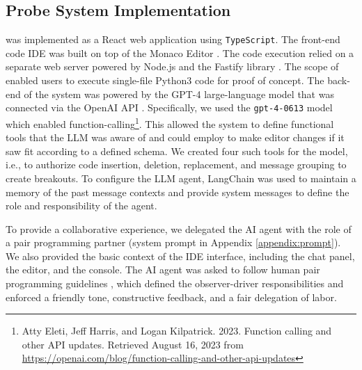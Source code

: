 \subsection{Probe System Implementation}
\sys{} was implemented as a React \cite{React} web application using \texttt{TypeScript}. The front-end code IDE was built on top of the Monaco Editor \cite{MonacoEditor}. The code execution relied on a separate web server powered by Node.js \cite{nodejs} and the Fastify library \cite{fastify}. 
The scope of \sys{} enabled users to execute single-file Python3 code for proof of concept.
The back-end of the system was powered by the GPT-4 \cite{OpenAI2023GPT4TR} large-language model that was connected via the OpenAI API \cite{openaiapi}. Specifically, we used the \verb|gpt-4-0613| model which enabled function-calling\footnote{Atty Eleti, Jeff Harris, and Logan Kilpatrick. 2023. Function calling and other API updates. Retrieved August 16, 2023 from \url{https://openai.com/blog/function-calling-and-other-api-updates}}. This allowed the system to define functional tools that the LLM was aware of and could employ to make editor changes if it saw fit according to a defined schema. 
We created four such tools for the model, i.e., to authorize code insertion, deletion, replacement, and message grouping to create breakouts. To configure the LLM agent, LangChain \cite{Langchain} was used to maintain a memory of the past message contexts and provide system messages to define the role and responsibility of the agent. 

To provide a collaborative experience, we delegated the AI agent with the role of a pair programming partner (system prompt in Appendix \ref{appendix:prompt}). 
We also provided the basic context of the IDE interface, including the chat panel, the editor, and the console. The AI agent was asked to follow human pair programming guidelines \cite{cockburn2000costs, williams2003pair}, which defined the observer-driver responsibilities and enforced a friendly tone, constructive feedback, and a fair delegation of labor.
